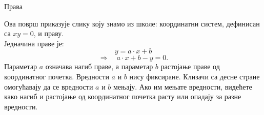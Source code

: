 \documentclass[sr]{./../../common/SurferDesc}%
\begin{document}
\footnotesize
%
 
\begin{surferPage}
  \begin{surferTitle}Права\end{surferTitle}
   \begin{surferText}
   
Ова површ приказује слику коју знамо из школе: координатни систем, дефинисан са $xy=0$, и праву. \\Једначина праве је:
\[y=a\cdot x + b\]
\[ \Rightarrow \quad a\cdot x +b -y=0.\]
Параметар  $a$ означава нагиб праве, а параметар  $b$ растојање праве од координатног почетка.
\newline \newline
Вредности  $a$ и $b$ нису фиксиране. Клизачи са десне стране омогућавају да се вредности $a$ и $b$ мењају. Ако им мењате вредности, видећете како нагиб и растојање од координатног почетка расту или опадају за разне вредности.

     \end{surferText}
\end{surferPage}
\end{document}
